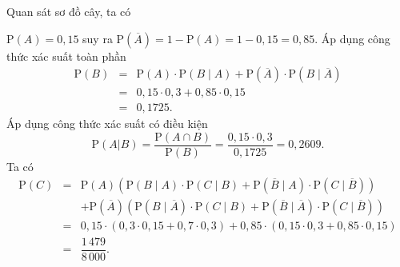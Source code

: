 \begin{ex}
{\begin{center}
		\end{center}
		Quan sát sơ đồ cây, ta có
		\begin{itemchoice}
			\itemch $\mathrm{P}(A) = 0{,}15$ suy ra $\mathrm{P}\left(\overline{A}\right) =1-\mathrm{P}(A)=1-0{,}15= 0{,}85$.
			\itemch Áp dụng công thức xác suất toàn phần
			\begin{eqnarray*}
				\mathrm{P}(B)&=&\mathrm{P}(A)\cdot \mathrm{P}\left(B\mid A\right)+\mathrm{P}\left(\overline{A}\right)\cdot \mathrm{P}\left(B\mid \overline{A}\right)\\
				&=&0{,}15 \cdot 0{,}3 + 0{,}85 \cdot 0{,}15\\
				&=&0{,}1725.
			\end{eqnarray*}
			\itemch Áp dụng công thức xác suất có điều kiện
			\[\mathrm{P}(A|B) = \dfrac{\mathrm{P}(A \cap B)}{\mathrm{P}(B)}
			=\dfrac{0{,}15 \cdot 0{,}3}{0{,}1725}=0{,}2609.\]
			\itemch Ta có
			\allowdisplaybreaks
			\begin{eqnarray*}
				\mathrm{P}(C)&=&\mathrm{P}(A)\left(\mathrm{P}\left(B\mid A\right)\cdot \mathrm{P}\left(C\mid B\right)+\mathrm{P}\left(\overline{B}\mid A\right)\cdot \mathrm{P}\left(C\mid \overline{B}\right)\right)\\
				&&+\mathrm{P}\left(\overline{A}\right)\left(\mathrm{P}\left(B\mid \overline{A}\right)\cdot \mathrm{P}\left(C\mid B\right)+\mathrm{P}\left(\overline{B}\mid \overline{A}\right)\cdot \mathrm{P}\left(C\mid \overline{B}\right)\right)\\
				&=&0{,}15\cdot\left(0{,}3\cdot 0{,}15+0{,}7\cdot 0{,}3\right)+0{,}85\cdot\left(0{,}15\cdot 0{,}3+0{,}85\cdot 0{,}15\right)\\
				&=&\dfrac{1\,479}{8\,000}.
			\end{eqnarray*}
		\end{itemchoice}
	}
\end{ex}


